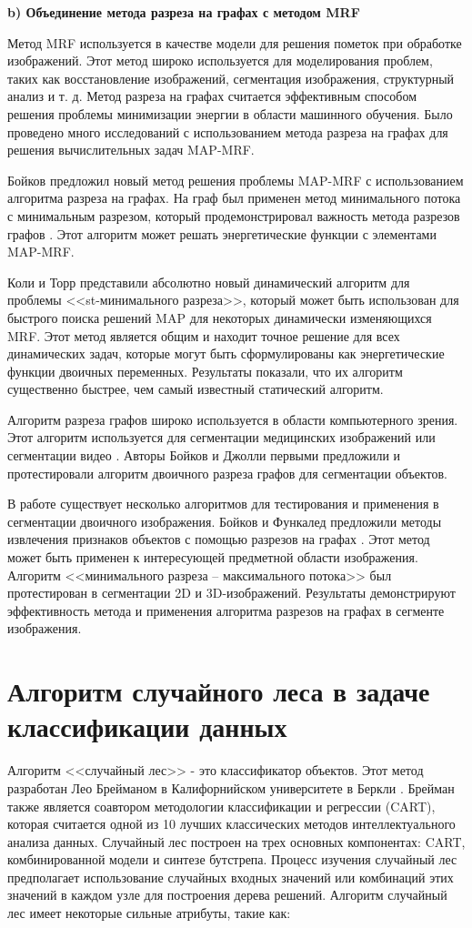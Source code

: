 \documentclass[a4paper,14pt]{extreport}
\begin{document}
\textbf{b)	Объединение метода разреза на графах с методом MRF}

Метод MRF используется в качестве модели для решения пометок при обработке изображений. Этот метод широко используется для моделирования проблем, таких как восстановление изображений, сегментация изображения, структурный анализ и т. д. Метод разреза на графах считается эффективным способом решения проблемы минимизации энергии в области машинного обучения. Было проведено много исследований с использованием метода разреза на графах для решения вычислительных задач MAP-MRF.

Бойков \cite{h123} предложил новый метод решения проблемы MAP-MRF с использованием алгоритма разреза на графах. На граф был применен метод минимального потока с минимальным разрезом, который продемонстрировал важность метода разрезов графов . Этот алгоритм может решать энергетические функции с элементами MAP-MRF.

Коли и Торр \cite{h124} представили абсолютно новый динамический алгоритм для проблемы <<st-минимального разреза>>, который может быть использован для быстрого поиска решений MAP для некоторых динамически изменяющихся MRF. Этот метод является общим и находит точное решение для всех динамических задач, которые могут быть сформулированы как энергетические функции двоичных переменных. Результаты показали, что их алгоритм существенно быстрее, чем самый известный статический алгоритм.

Алгоритм разреза графов широко используется в области компьютерного зрения. Этот алгоритм используется для сегментации медицинских изображений или сегментации видео \cite{h125}. Авторы Бойков и Джолли \cite{h126} первыми предложили и протестировали алгоритм двоичного разреза графов для сегментации объектов.

В работе \cite{h127} существует несколько алгоритмов для тестирования и применения в сегментации двоичного изображения. Бойков и Функалед предложили методы извлечения признаков объектов с помощью разрезов на графах \cite{h128}. Этот метод может быть применен к интересующей предметной области изображения. Алгоритм <<минимального разреза -- максимального потока>> был протестирован в сегментации 2D и 3D-изображений. Результаты демонстрируют эффективность метода и применения алгоритма разрезов на графах в сегменте изображения.

\section{Алгоритм случайного леса в задаче классификации данных}
Алгоритм <<случайный лес>> - это классификатор объектов. Этот метод разработан Лео Брейманом в Калифорнийском университете в Беркли \cite{h129}. Брейман также является соавтором методологии классификации и регрессии (CART), которая считается одной из 10 лучших классических методов интеллектуального анализа данных. Случайный лес построен на трех основных компонентах: CART, комбинированной модели и синтезе бутстрепа.
Процесс изучения случайный лес предполагает использование случайных входных значений или комбинаций этих значений в каждом узле для построения дерева решений. Алгоритм случайный лес имеет некоторые сильные атрибуты, такие как: 
\end{document}
